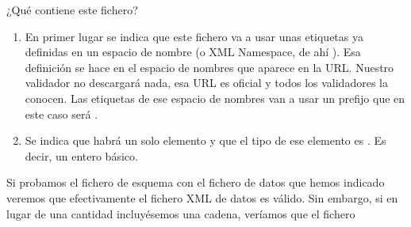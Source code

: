 \documentclass[letterpaper,10pt,spanish]{sphinxmanual}
\begin{document}
¿Qué contiene este fichero?
\begin{enumerate}
\item {} 
En primer lugar se indica que este fichero va a usar unas etiquetas ya definidas en un espacio de nombre (o XML Namespace, de ahí ). Esa definición se hace en el espacio de nombres que aparece en la URL. Nuestro validador no descargará nada, esa URL es oficial y todos los validadores la conocen. Las etiquetas de ese espacio de nombres van a usar un prefijo que en este caso será .

\item {} 
Se indica que habrá un solo elemento y que el tipo de ese elemento es . Es decir, un entero básico.

\end{enumerate}

Si probamos el fichero de esquema con el fichero de datos que hemos indicado veremos que efectivamente el fichero XML de datos es válido. Sin embargo, si en lugar de una cantidad incluyésemos una cadena, veríamos que el fichero 
\end{document}

